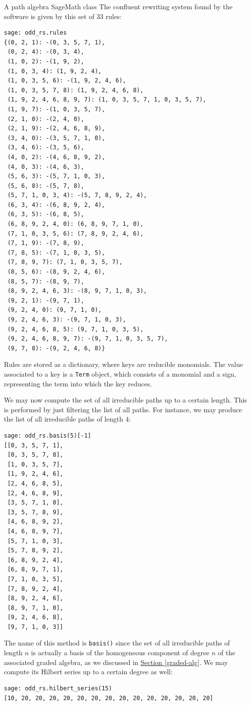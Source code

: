 \begin{chapter}{A path algebra SageMath class}
The confluent rewriting system found by the software is given by this set of 33 rules:
\begin{lstlisting}
sage: odd_rs.rules
{(0, 2, 1): -(0, 3, 5, 7, 1),
 (0, 2, 4): -(0, 3, 4),
 (1, 0, 2): -(1, 9, 2),
 (1, 0, 3, 4): (1, 9, 2, 4),
 (1, 0, 3, 5, 6): -(1, 9, 2, 4, 6),
 (1, 0, 3, 5, 7, 8): (1, 9, 2, 4, 6, 8),
 (1, 9, 2, 4, 6, 8, 9, 7): (1, 0, 3, 5, 7, 1, 0, 3, 5, 7),
 (1, 9, 7): -(1, 0, 3, 5, 7),
 (2, 1, 0): -(2, 4, 0),
 (2, 1, 9): -(2, 4, 6, 8, 9),
 (3, 4, 0): -(3, 5, 7, 1, 0),
 (3, 4, 6): -(3, 5, 6),
 (4, 0, 2): -(4, 6, 8, 9, 2),
 (4, 0, 3): -(4, 6, 3),
 (5, 6, 3): -(5, 7, 1, 0, 3),
 (5, 6, 8): -(5, 7, 8),
 (5, 7, 1, 0, 3, 4): -(5, 7, 8, 9, 2, 4),
 (6, 3, 4): -(6, 8, 9, 2, 4),
 (6, 3, 5): -(6, 8, 5),
 (6, 8, 9, 2, 4, 0): (6, 8, 9, 7, 1, 0),
 (7, 1, 0, 3, 5, 6): (7, 8, 9, 2, 4, 6),
 (7, 1, 9): -(7, 8, 9),
 (7, 8, 5): -(7, 1, 0, 3, 5),
 (7, 8, 9, 7): (7, 1, 0, 3, 5, 7),
 (8, 5, 6): -(8, 9, 2, 4, 6),
 (8, 5, 7): -(8, 9, 7),
 (8, 9, 2, 4, 6, 3): -(8, 9, 7, 1, 0, 3),
 (9, 2, 1): -(9, 7, 1),
 (9, 2, 4, 0): (9, 7, 1, 0),
 (9, 2, 4, 6, 3): -(9, 7, 1, 0, 3),
 (9, 2, 4, 6, 8, 5): (9, 7, 1, 0, 3, 5),
 (9, 2, 4, 6, 8, 9, 7): -(9, 7, 1, 0, 3, 5, 7),
 (9, 7, 8): -(9, 2, 4, 6, 8)}
\end{lstlisting}
Rules are stored as a dictionary, where keys are reducible monomials. The value associated to a key is a \texttt{Term} object, which consists of a monomial and a sign, representing the term into which the key reduces.

We may now compute the set of all irreducible paths up to a certain length. This is performed by just filtering the list of all paths. For instance, we may produce the list of all irreducible paths of length 4:
\begin{lstlisting}
sage: odd_rs.basis(5)[-1]
[[0, 3, 5, 7, 1],
 [0, 3, 5, 7, 8],
 [1, 0, 3, 5, 7],
 [1, 9, 2, 4, 6],
 [2, 4, 6, 8, 5],
 [2, 4, 6, 8, 9],
 [3, 5, 7, 1, 0],
 [3, 5, 7, 8, 9],
 [4, 6, 8, 9, 2],
 [4, 6, 8, 9, 7],
 [5, 7, 1, 0, 3],
 [5, 7, 8, 9, 2],
 [6, 8, 9, 2, 4],
 [6, 8, 9, 7, 1],
 [7, 1, 0, 3, 5],
 [7, 8, 9, 2, 4],
 [8, 9, 2, 4, 6],
 [8, 9, 7, 1, 0],
 [9, 2, 4, 6, 8],
 [9, 7, 1, 0, 3]]
\end{lstlisting}
The name of this method is \texttt{basis()} since the set of all irreducible paths of length $n$ is actually a basis of the homogeneous component of degree $n$ of the associated graded algebra, as we discussed in \hyperref[graded-alg]{Section \ref*{graded-alg}}. We may compute its Hilbert series up to a certain degree as well:
\begin{lstlisting}
sage: odd_rs.hilbert_series(15)
[10, 20, 20, 20, 20, 20, 20, 20, 20, 20, 20, 20, 20, 20, 20]
\end{lstlisting}


\end{chapter}
